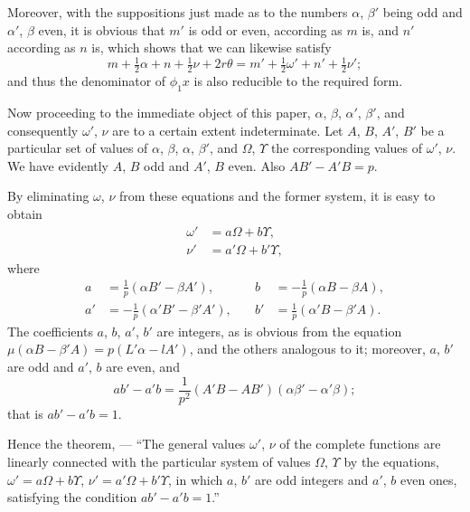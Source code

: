 \documentclass[11pt,a4paper]{book}
\begin{document}
\newpage
\setcounter{page}{133}

Moreover, with the suppositions just made as to the numbers $\alpha$, $\beta'$ being odd and $\alpha'$, $\beta$ even, it is obvious
that $m'$ is odd or even, according as $m$ is, and $n'$ according as $n$ is, which shows
that we can likewise satisfy
\[
m + \tfrac{1}{2}\alpha + n + \tfrac{1}{2}\nu + 2r\theta = m' + \tfrac{1}{2}\omega' + n' + \tfrac{1}{2}\nu';
\]
and thus the denominator of $\phi_1 x$ is also reducible to the required form.

Now proceeding to the immediate object of this paper, $\alpha$, $\beta$, $\alpha'$, $\beta'$, and consequently
$\omega'$, $\nu$ are to a certain extent indeterminate. Let $A$, $B$, $A'$, $B'$ be a particular set of
values of $\alpha$, $\beta$, $\alpha$, $\beta'$, and $\Omega$, $\Upsilon$ the corresponding values of $\omega'$, $\nu$. We have evidently
$A$, $B$ odd and $A'$, $B$ even. Also $AB' - A'B = p$.

\newpage
\setcounter{page}{134}

By eliminating $\omega$, $\nu$ from these equations and the former system, it is easy to obtain
\begin{align*}
\omega' &= a\Omega + b\Upsilon,\\
\nu' &= a'\Omega + b'\Upsilon,
\end{align*}
where
\begin{align*}
a &= \frac{1}{p}(\alpha B' - \beta A'),\quad &b &= -\frac{1}{p}(\alpha B - \beta A),\\
a' &= -\frac{1}{p}(\alpha' B' - \beta' A'),\quad &b' &= \frac{1}{p}(\alpha' B - \beta' A).
\end{align*}
The coefficients $a$, $b$, $a'$, $b'$ are integers, as is obvious from the equation $\mu(\alpha B - \beta' A)
= p(L'\alpha - lA')$, and the others analogous to it; moreover, $a$, $b'$ are odd and $a'$, $b$ are
even, and
\[
ab' - a'b = \frac{1}{p^2}(A'B - AB')(\alpha\beta' - \alpha'\beta);
\]
that is $ab' - a'b = 1$.

Hence the theorem, --- ``The general values $\omega'$, $\nu$ of the complete functions are
linearly connected with the particular system of values $\Omega$, $\Upsilon$ by the equations,
$\omega' = a\Omega + b\Upsilon$, $\nu' = a'\Omega + b'\Upsilon$, in which $a$, $b'$ are odd integers and $a'$, $b$ even ones,
satisfying the condition $ab' - a'b = 1$.''

\newpage
\setcounter{page}{135}
\end{document}
